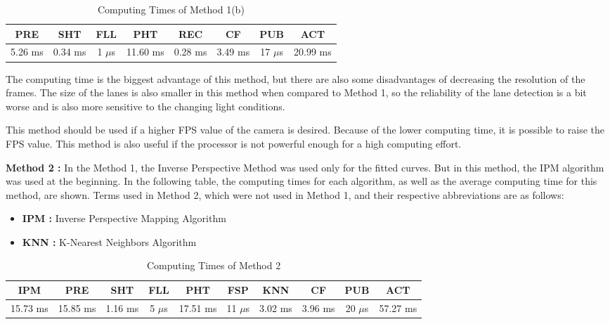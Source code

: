 \begin{table}[ht]
\caption{Computing Times of Method 1(b)} 
\centering 
  \begin{tabular}{ | c | c | c | c | c | c | c | c |}
    \hline
  
  PRE & SHT & FLL & PHT & REC & CF & PUB & ACT \\ \hline  
  5.26 ms   &  0.34 ms  &  1 $\mu$s  &  11.60 ms  &  0.28 ms  &  3.49 ms &  17 $\mu$s  &  20.99 ms \\ \hline  
    
    
      \end{tabular}
  \label{tab:Case4_Times}
\end{table}

The computing time is the biggest advantage of this method, but there are also some disadvantages of decreasing the resolution of the frames. The size of the lanes is also smaller in this method when compared to Method 1, so the reliability of the lane detection is a bit worse and is also more sensitive to the changing light conditions.

This method should be used if a higher FPS value of the camera is desired. Because of the lower computing time, it is possible to raise the FPS value. This method is also useful if the processor is not powerful enough for a high computing effort.







\textbf{Method 2 : }In the Method 1, the Inverse Perspective Method was used only for the fitted curves.
But in this method, the IPM algorithm was used at the beginning. In the following table, the computing times for each algorithm, as well as the average computing time for this method, are shown. Terms used in Method 2, which were not used in Method 1, and their respective abbreviations are as follows:


\begin{itemize}[noitemsep]
\item\textbf{IPM : }Inverse Perspective Mapping Algorithm
\item\textbf{KNN : }K-Nearest Neighbors Algorithm
\end{itemize}


\begin{table}[ht]
\caption{Computing Times of Method 2} 
\centering 
  \begin{tabular}{ | c | c | c | c | c | c | c | c | c | c |}
    \hline
  
  IPM 		& PRE 		& SHT	   & FLL 	   & PHT 	   & FSP 	    & KNN 	   & CF 	  & PUB 	& ACT \\ \hline  
  15.73 ms & 15.85 ms & 1.16 ms & 5 $\mu$s & 17.51 ms & 11 $\mu$s & 3.02 ms & 3.96 ms & 20 $\mu$s       & 57.27 ms   \\ \hline  
    
      \end{tabular}
  \label{tab:Case2_Times}
\end{table}

